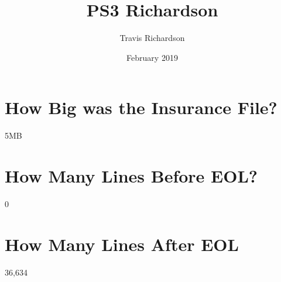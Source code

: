 \documentclass{article}
\title{PS3 Richardson}
\author{Travis Richardson }
\date{February 2019}
\begin{document}
\maketitle

\section{How Big was the Insurance File?}
5MB 
\section{How Many Lines Before EOL?}
0
\section{How Many Lines After EOL}
36,634
\end{document}

